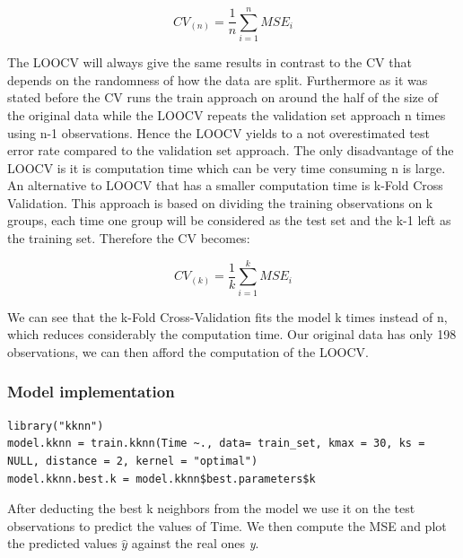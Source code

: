 \documentclass[]{report}
\begin{document}
\begin{center}
	$$CV_{(n)} = \frac{1}{n} \sum_{i=1}^{n} MSE_{i} $$
\end{center}

The LOOCV will always give the same results in contrast to the CV that depends on the randomness of how the data are split. Furthermore as it was stated before the CV runs the train approach on around the half of the size of the original data while the LOOCV repeats the validation set approach n times using n-1 observations. Hence the LOOCV yields to a not overestimated test error rate compared to the validation set approach. The only disadvantage of the LOOCV is it is computation time which can be very time consuming n is large.\\

An alternative to LOOCV that has a smaller computation time is k-Fold Cross Validation. This approach is based on dividing the training observations on k groups, each time one group will be considered as the test set and the k-1 left as the training set. Therefore the CV becomes:

\begin{center}
	$$CV_{(k)} = \frac{1}{k} \sum_{i=1}^{k} MSE_{i} $$
\end{center}

We can see that the k-Fold Cross-Validation fits the model k times instead of n, which reduces considerably the computation time. Our original data has only 198 observations, we can then afford the computation of the LOOCV. \\

\subsubsection{Model implementation}

\begin{lstlisting}
library("kknn")
model.kknn = train.kknn(Time ~., data= train_set, kmax = 30, ks = NULL, distance = 2, kernel = "optimal")
model.kknn.best.k = model.kknn$best.parameters$k
\end{lstlisting}

After deducting the best k neighbors from the model we use it on the test observations to predict the values of Time. 
We then compute the MSE and plot the predicted values $\hat{y}$ against the real ones \textit{y}.
\end{document}
